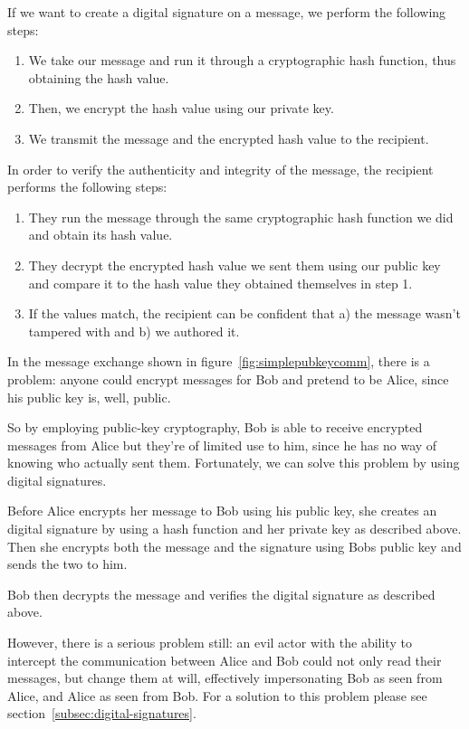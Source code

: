 If we want to create a digital signature on a message, we perform the following steps:
\begin{enumerate}\label{enum:digitalsignaturecreation}
    \item We take our message and run it through a cryptographic hash function, thus obtaining the hash value.
    \item Then, we encrypt the hash value using our private key.
    \item We transmit the message and the encrypted hash value to the recipient.
\end{enumerate}

In order to verify the authenticity and integrity of the message, the recipient performs the following steps:
\begin{enumerate}
    \item They run the message through the same cryptographic hash function we did and obtain its hash value.
    \item They decrypt the encrypted hash value we sent them using our public key and compare it to the hash value they obtained themselves in step 1.
    \item If the values match, the recipient can be confident that a) the message wasn't tampered with and b) we authored it.
\end{enumerate}

In the message exchange shown in figure~\ref{fig:simplepubkeycomm},
there is a problem: anyone could encrypt messages for Bob and pretend to be Alice, since his public key is, well, public.

So by employing public-key cryptography, Bob is able to receive encrypted messages from Alice but they're of limited use to him,
since he has no way of knowing who actually sent them.
Fortunately, we can solve this problem by using digital signatures.

Before Alice encrypts her message to Bob using his public key,
she creates an digital signature by using a hash function and her private key as described above.
Then she encrypts both the message and the signature using Bobs public key and sends the two to him.

Bob then decrypts the message and verifies the digital signature as described above.

However, there is a serious problem still: an evil actor with the ability to intercept the communication
between Alice and Bob could not only read their messages,
but change them at will, effectively impersonating Bob as seen from Alice,
and Alice as seen from Bob.
For a solution to this problem please see section~\ref{subsec:digital-signatures}.

